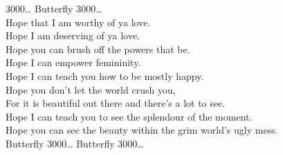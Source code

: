  3000… Butterfly 3000… \\

Hope that I am worthy of ya love. \\
Hope I am deserving of ya love. \\
Hope you can brush off the powers that be. \\
Hope I can empower femininity. \\
Hope I can teach you how to be mostly happy. \\
Hope you don't let the world crush you, \\
For it is beautiful out there and there's a lot to see. \\
Hope I can teach you to see the splendour of the moment. \\
Hope you can see the beauty within the grim world's ugly mess. \\

Butterfly 3000… Butterfly 3000… \\
